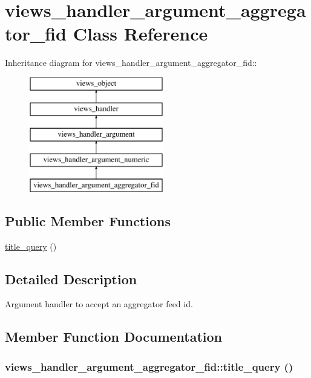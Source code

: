 \hypertarget{classviews__handler__argument__aggregator__fid}{
\section{views\_\-handler\_\-argument\_\-aggregator\_\-fid Class Reference}
\label{classviews__handler__argument__aggregator__fid}
}
Inheritance diagram for views\_\-handler\_\-argument\_\-aggregator\_\-fid::\begin{figure}[H]
\begin{center}
\leavevmode
\includegraphics[height=5cm]{classviews__handler__argument__aggregator__fid}
\end{center}
\end{figure}
\subsection*{Public Member Functions}
\begin{CompactItemize}
\item 
\hyperlink{classviews__handler__argument__aggregator__fid_4d5f8aef22b4b3431c92fe2a496d9789}{title\_\-query} ()
\end{CompactItemize}


\subsection{Detailed Description}
Argument handler to accept an aggregator feed id. 

\subsection{Member Function Documentation}
\hypertarget{classviews__handler__argument__aggregator__fid_4d5f8aef22b4b3431c92fe2a496d9789}{
\subsubsection[{title\_\-query}]{\setlength{\rightskip}{0pt plus 5cm}views\_\-handler\_\-argument\_\-aggregator\_\-fid::title\_\-query ()}}
\label{classviews__handler__argument__aggregator__fid_4d5f8aef22b4b3431c92fe2a496d9789}


